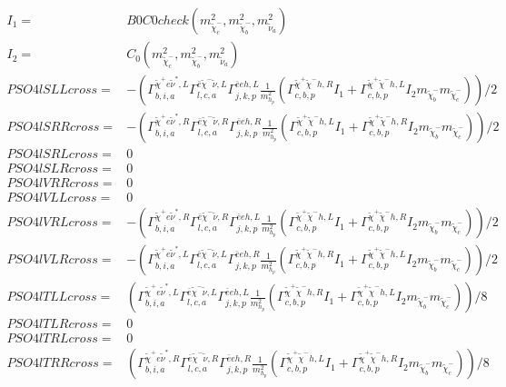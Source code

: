 \documentclass[A4,landscape]{article}
\begin{document}
\begin{align} 
I_1= & B0C0check(m^2_{\tilde{\chi}^-_{{c}}}, m^2_{\tilde{\chi}^-_{{b}}}, m^2_{\tilde{\nu}_{{a}}}) \\ 
I_2= & C_0(m^2_{\tilde{\chi}^-_{{c}}}, m^2_{\tilde{\chi}^-_{{b}}}, m^2_{\tilde{\nu}_{{a}}}) \\ 
  PSO4lSLLcross= & -( \Gamma^{\tilde{\chi}^+e \tilde{\nu}^*,L}_{b, i, a} \Gamma^{\bar{e}\tilde{\chi}^- \tilde{\nu} ,L}_{l, c, a} \Gamma^{\bar{e}e h ,L}_{j, k, p} \frac{1}{m^2_{h_{{p}}}} (\Gamma^{\tilde{\chi}^+\tilde{\chi}^- h ,R}_{c, b, p} I_1 + \Gamma^{\tilde{\chi}^+\tilde{\chi}^- h ,L}_{c, b, p} I_2 m_{\tilde{\chi}^-_{{b}}} m_{\tilde{\chi}^-_{{c}}}))/2 \\ 
  PSO4lSRRcross= & -( \Gamma^{\tilde{\chi}^+e \tilde{\nu}^*,R}_{b, i, a} \Gamma^{\bar{e}\tilde{\chi}^- \tilde{\nu} ,R}_{l, c, a} \Gamma^{\bar{e}e h ,R}_{j, k, p} \frac{1}{m^2_{h_{{p}}}} (\Gamma^{\tilde{\chi}^+\tilde{\chi}^- h ,L}_{c, b, p} I_1 + \Gamma^{\tilde{\chi}^+\tilde{\chi}^- h ,R}_{c, b, p} I_2 m_{\tilde{\chi}^-_{{b}}} m_{\tilde{\chi}^-_{{c}}}))/2 \\ 
  PSO4lSRLcross= & 0 \\ 
  PSO4lSLRcross= & 0 \\ 
  PSO4lVRRcross= & 0 \\ 
  PSO4lVLLcross= & 0 \\ 
  PSO4lVRLcross= & -( \Gamma^{\tilde{\chi}^+e \tilde{\nu}^*,R}_{b, i, a} \Gamma^{\bar{e}\tilde{\chi}^- \tilde{\nu} ,R}_{l, c, a} \Gamma^{\bar{e}e h ,L}_{j, k, p} \frac{1}{m^2_{h_{{p}}}} (\Gamma^{\tilde{\chi}^+\tilde{\chi}^- h ,L}_{c, b, p} I_1 + \Gamma^{\tilde{\chi}^+\tilde{\chi}^- h ,R}_{c, b, p} I_2 m_{\tilde{\chi}^-_{{b}}} m_{\tilde{\chi}^-_{{c}}}))/2 \\ 
  PSO4lVLRcross= & -( \Gamma^{\tilde{\chi}^+e \tilde{\nu}^*,L}_{b, i, a} \Gamma^{\bar{e}\tilde{\chi}^- \tilde{\nu} ,L}_{l, c, a} \Gamma^{\bar{e}e h ,R}_{j, k, p} \frac{1}{m^2_{h_{{p}}}} (\Gamma^{\tilde{\chi}^+\tilde{\chi}^- h ,R}_{c, b, p} I_1 + \Gamma^{\tilde{\chi}^+\tilde{\chi}^- h ,L}_{c, b, p} I_2 m_{\tilde{\chi}^-_{{b}}} m_{\tilde{\chi}^-_{{c}}}))/2 \\ 
  PSO4lTLLcross= & ( \Gamma^{\tilde{\chi}^+e \tilde{\nu}^*,L}_{b, i, a} \Gamma^{\bar{e}\tilde{\chi}^- \tilde{\nu} ,L}_{l, c, a} \Gamma^{\bar{e}e h ,L}_{j, k, p} \frac{1}{m^2_{h_{{p}}}} (\Gamma^{\tilde{\chi}^+\tilde{\chi}^- h ,R}_{c, b, p} I_1 + \Gamma^{\tilde{\chi}^+\tilde{\chi}^- h ,L}_{c, b, p} I_2 m_{\tilde{\chi}^-_{{b}}} m_{\tilde{\chi}^-_{{c}}}))/8 \\ 
  PSO4lTLRcross= & 0 \\ 
  PSO4lTRLcross= & 0 \\ 
  PSO4lTRRcross= & ( \Gamma^{\tilde{\chi}^+e \tilde{\nu}^*,R}_{b, i, a} \Gamma^{\bar{e}\tilde{\chi}^- \tilde{\nu} ,R}_{l, c, a} \Gamma^{\bar{e}e h ,R}_{j, k, p} \frac{1}{m^2_{h_{{p}}}} (\Gamma^{\tilde{\chi}^+\tilde{\chi}^- h ,L}_{c, b, p} I_1 + \Gamma^{\tilde{\chi}^+\tilde{\chi}^- h ,R}_{c, b, p} I_2 m_{\tilde{\chi}^-_{{b}}} m_{\tilde{\chi}^-_{{c}}}))/8 \\ 
\end{align} 
\end{document}
